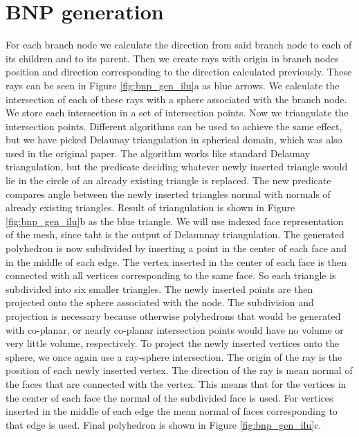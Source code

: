 \section{BNP generation}\label{sec:bnp_gen}
For each branch node we calculate the direction from said branch node to each of its children and to its parent. Then we create rays with origin in branch nodes position and direction corresponding to the direction calculated previously. These rays can be seen in Figure \ref{fig:bnp_gen_ilu}a as blue arrows. We calculate the intersection of each of these rays with a sphere associated with the branch node. We store each intersection in a set of intersection points. Now we triangulate the intersection points. Different algorithms can be used to achieve the same effect, but we have picked Delaunay triangulation in spherical domain, which was also used in the original paper. The algorithm works like standard Delaunay triangulation, but the predicate deciding whatever newly inserted triangle would lie in the circle of an already existing triangle is replaced. The new predicate compares angle between the newly inserted triangles normal with normals of already existing triangles. Result of triangulation is shown in Figure \ref{fig:bnp_gen_ilu}b as the blue triangle. We will use indexed face representation of the mesh, since taht is the output of Delaunnay triangulation. The generated polyhedron is now subdivided by inserting a point in the center of each face and in the middle of each edge. The vertex inserted in the center of each face is then connected with all vertices corresponding to the same face. So each triangle is subdivided into six smaller triangles. The newly inserted points are then projected onto the sphere associated with the node. The subdivision and projection is necessary because otherwise polyhedrons that would be generated with co-planar, or nearly co-planar intersection points would have no volume or very little volume, respectively. To project the newly inserted vertices onto the sphere, we once again use a ray-sphere intersection. The origin of the ray is the position of each newly inserted vertex. The direction of the ray is mean normal of the faces that are connected with the vertex. This means that for the vertices in the center of each face the normal of the subdivided face is used. For vertices inserted in the middle of each edge the mean normal of faces corresponding to that edge is used. Final polyhedron is shown in Figure \ref{fig:bnp_gen_ilu}c.

